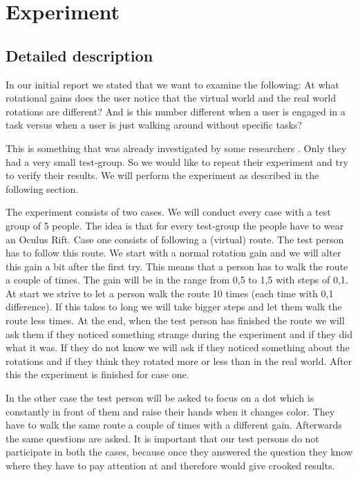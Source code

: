 \section{Experiment}

\subsection{Detailed description}\label{sec:description}
In our initial report we stated that we want to examine the following:
At what rotational gains does the user notice that the virtual world and the real world rotations are different?
And is this number different when a user is engaged in a task versus when a user is just walking around without specific tasks?

This is something that was already investigated by some researchers \cite{steinicke2}. 
Only they had a very small test-group. 
So we would like to repeat their experiment and try to verify their results. 
We will perform the experiment as described in the following section.

The experiment consists of two cases. 
We will conduct every case with a test group of 5 people. 
The idea is that for every test-group the people have to wear an Oculus Rift. 
Case one consists of following a (virtual) route. 
The test person has to follow this route. 
We start with a normal rotation gain and we will alter this gain a bit after the first try. 
This means that a person has to walk the route a couple of times. 
The gain will be in the range from 0,5 to 1,5 with steps of 0,1. 
At start we strive to let a person walk the route 10 times (each time with 0,1 difference). 
If this takes to long we will take bigger steps and let them walk the route less times. 
At the end, when the test person has finished the route we will ask them if they noticed something strange during the experiment and if they did what it was. 
If they do not know we will ask if they noticed something about the rotations and if they think they rotated more or less than in the real world. 
After this the experiment is finished for case one.

In the other case the test person will be asked to focus on a dot which is constantly in front of them and raise their hands when it changes color. 
They have to walk the same route a couple of times with a different gain. 
Afterwards the same questions are asked. 
It is important that our test persons do not participate in both the cases, because once they answered the question they know where they have to pay attention at and therefore would give crooked results.

